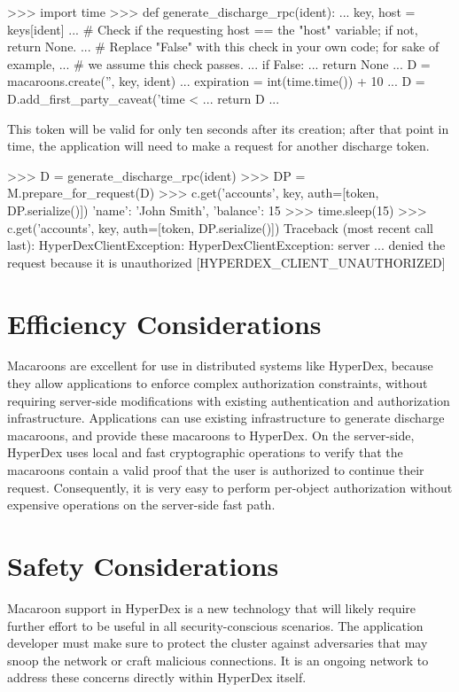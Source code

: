 \begin{pythoncode}
>>> import time
>>> def generate_discharge_rpc(ident):
...     key, host = keys[ident]
...     # Check if the requesting host == the "host" variable; if not, return None.
...     # Replace "False" with this check in your own code; for sake of example,
...     # we assume this check passes.
...     if False:
...         return None
...     D = macaroons.create('', key, ident)
...     expiration = int(time.time()) + 10
...     D = D.add_first_party_caveat('time < %
...     return D
...
\end{pythoncode}

This token will be valid for only ten seconds after its creation; after that
point in time, the application will need to make a request for another discharge
token.

\begin{pythoncode}
>>> D = generate_discharge_rpc(ident)
>>> DP = M.prepare_for_request(D)
>>> c.get('accounts', key, auth=[token, DP.serialize()])
{'name': 'John Smith', 'balance': 15}
>>> time.sleep(15)
>>> c.get('accounts', key, auth=[token, DP.serialize()])
Traceback (most recent call last):
HyperDexClientException: HyperDexClientException: server ... denied the request because it is unauthorized [HYPERDEX_CLIENT_UNAUTHORIZED]
\end{pythoncode}

\section{Efficiency Considerations}

Macaroons are excellent for use in distributed systems like HyperDex, because
they allow applications to enforce complex authorization constraints, without
requiring server-side modifications with existing authentication and
authorization infrastructure.  Applications can use existing infrastructure to
generate discharge macaroons, and provide these macaroons to HyperDex.  On the
server-side, HyperDex uses local and fast cryptographic operations to verify
that the macaroons contain a valid proof that the user is authorized to continue
their request.  Consequently, it is very easy to perform per-object
authorization without expensive operations on the server-side fast path.

\section{Safety Considerations}

Macaroon support in HyperDex is a new technology that will likely require
further effort to be useful in all security-conscious scenarios.  The
application developer must make sure to protect the cluster against adversaries
that may snoop the network or craft malicious connections.  It is an ongoing
network to address these concerns directly within HyperDex itself.
